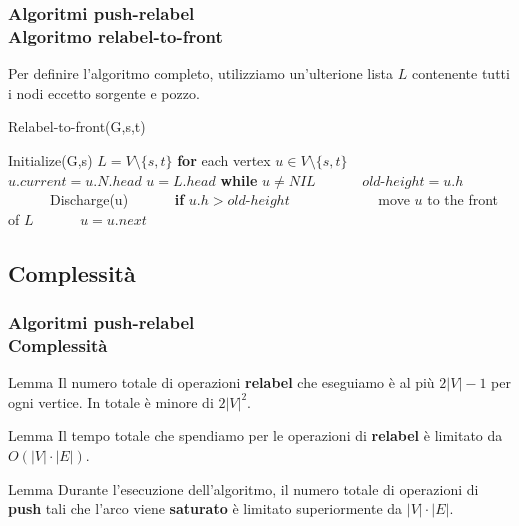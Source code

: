 \documentclass{beamer}
\begin{document}
\begin{frame}
\frametitle{Algoritmi push-relabel\\Algoritmo relabel-to-front}
Per definire l'algoritmo completo, utilizziamo un'ulterione lista $L$ contenente tutti i nodi eccetto sorgente e pozzo.
\begin{algorithm}[H]
    \caption{Relabel-to-front(G,s,t)}%
    \begin{algorithmic}[1]
        \State Initialize(G,s)
        \State $L=V\setminus\{s,t\}$
        \State \textbf{for} each vertex $u\in V\setminus\{s,t\}$
        \State \ \ \ \ \ \ $u.current=u.N.head$
        \State $u=L.head$
        \State \textbf{while} $u\not =NIL$
        \State \ \ \ \ \ \ $old\mbox{-}height=u.h$
        \State \ \ \ \ \ \ Discharge(u)
        \State \ \ \ \ \ \ \textbf{if} $u.h>old\mbox{-}height$
        \State \ \ \ \ \ \ \ \ \ \ \ \ move $u$ to the front of $L$
        \State \ \ \ \ \ \ $u=u.next$
    \end{algorithmic}
    \label{alg_1}
\end{algorithm}
\end{frame}

\subsection{Complessità}

\begin{frame}
\frametitle{Algoritmi push-relabel\\Complessità}
\begin{block}{Lemma}
Il numero totale di operazioni \textbf{relabel} che eseguiamo è al più $2|V|-1$ per ogni vertice. In totale è minore di $2|V|^2$.
\end{block}
\begin{block}{Lemma}
Il tempo totale che spendiamo per le operazioni di \textbf{relabel} è limitato da $O(|V|\cdot|E|)$.
\end{block}
\begin{block}{Lemma}
Durante l'esecuzione dell'algoritmo, il numero totale di operazioni di \textbf{push} tali che l'arco viene \textbf{saturato} è limitato superiormente da $|V|\cdot|E|$.
\end{block}
\end{frame}
\end{document}
